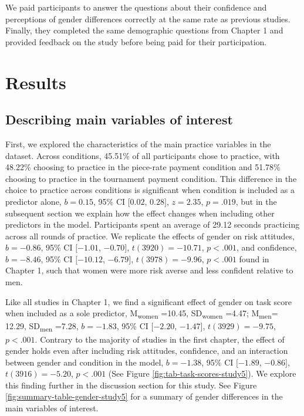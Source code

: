 \documentclass[a4paper, nobind]{templates/ociamthesis}
\begin{document}
We paid participants to answer the questions about their confidence and perceptions of gender differences correctly at the same rate as previous studies. Finally, they completed the same demographic questions from Chapter 1 and provided feedback on the study before being paid for their participation.

\hypertarget{results-3}{%
\section{Results}\label{results-3}}

\hypertarget{describing-main-variables-of-interest-3}{%
\subsection{Describing main variables of interest}\label{describing-main-variables-of-interest-3}}

First, we explored the characteristics of the main practice variables in the dataset. Across conditions, 45.51\% of all participants chose to practice, with 48.22\% choosing to practice in the piece-rate payment condition and 51.78\% choosing to practice in the tournament payment condition. This difference in the choice to practice across conditions is significant when condition is included as a predictor alone, \(b = 0.15\), 95\% CI \([0.02\), \(0.28]\), \(z = 2.35\), \(p = .019\), but in the subsequent section we explain how the effect changes when including other predictors in the model. Participants spent an average of 29.12 seconds practicing across all rounds of practice. We replicate the effects of gender on risk attitudes, \(b = -0.86\), 95\% CI \([-1.01\), \(-0.70]\), \(t(3920) = -10.71\), \(p < .001\), and confidence, \(b = -8.46\), 95\% CI \([-10.12\), \(-6.79]\), \(t(3978) = -9.96\), \(p < .001\) found in Chapter 1, such that women were more risk averse and less confident relative to men.

Like all studies in Chapter 1, we find a significant effect of gender on task score when included as a sole predictor, M\textsubscript{women} =10.45, SD\textsubscript{women} =4.47; M\textsubscript{men}= 12.29, SD\textsubscript{men} =7.28, \(b = -1.83\), 95\% CI \([-2.20\), \(-1.47]\), \(t(3929) = -9.75\), \(p < .001\). Contrary to the majority of studies in the first chapter, the effect of gender holds even after including risk attitudes, confidence, and an interaction between gender and condition in the model, \(b = -1.38\), 95\% CI \([-1.89\), \(-0.86]\), \(t(3916) = -5.20\), \(p < .001\) (See Figure \ref{fig:tab-task-scores-study5}). We explore this finding further in the discussion section for this study. See Figure \ref{fig:summary-table-gender-study5} for a summary of gender differences in the main variables of interest.
\end{document}
